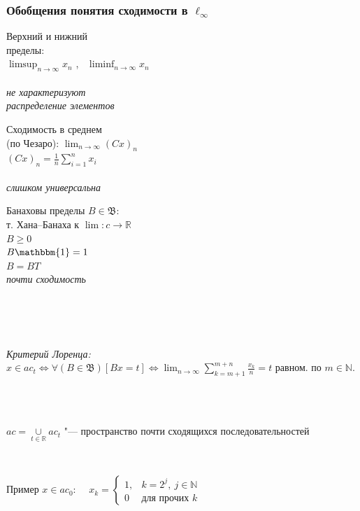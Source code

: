 \documentclass[10pt,pdf,hyperref={unicode},aspectratio=169]{beamer}
\theoremstyle{definition}
\begin{document}
\begin{frame}
	\frametitle{Обобщения понятия сходимости в $\ell_\infty$}
	\begin{varwidth}[t]{\linewidth}
		\centering
		Верхний и нижний
		\\
		пределы:
		\\
		$\displaystyle \limsup_{n\to\infty} x_n$
		,~
		$\displaystyle \liminf_{n\to\infty} x_n$
		\\~\\
		\emph{
			не характеризуют
			\\
			распределение элементов
		}
	\end{varwidth}
	\hfill
	\begin{varwidth}[t]{\linewidth}
		\centering
		Сходимость в среднем
		\\
		(по Чезаро):
		$\displaystyle \lim_{n\to\infty} (Cx)_n$
		\\
		$\displaystyle (Cx)_n = \frac1n\sum_{i=1}^n x_i$
		\\~\\
		\emph{слишком универсальна}
	\end{varwidth}
	\hfill
	\begin{varwidth}[t]{\linewidth}
		\centering
		Банаховы пределы $B\in \mathfrak{B}$:
		\\
		т. Хана--Банаха к $\lim: c\to\mathbb R$
		\\
			$B \geqslant 0$
		\\
			$B\mathbbm{1} = 1$
		\\
			$B=BT$
		\\
		\emph{почти сходимость}
	\end{varwidth}
	\\~\\~\\
	\begin{varwidth}[t]{\linewidth}
		\centering
		\emph{Критерий Лоренца:}
		$\displaystyle
			x\in ac_t
			\Leftrightarrow
			\forall(B\in\mathfrak{B})[Bx = t]
			\Leftrightarrow
			\lim_{n\to\infty}  \sum_{k=m+1}^{m+n} \frac{x_k}n = t
		$
		равном. по $m\in\mathbb{N}$.
	\end{varwidth}
	\\~\\
	\vspace{1em}
	\begin{varwidth}[t]{\linewidth}
		$\displaystyle ac = \mathop{\cup}\limits_{t\in\mathbb R} ac_t$ "--- пространство почти сходящихся последовательностей
	\end{varwidth}
	\\
	\vspace{1em}
	\begin{varwidth}[t]{\linewidth}
		Пример $x\in ac_0$:~~
		$\displaystyle
			x_k=\begin{cases}
				1, & k=2^j,~j\in\mathbb N
				\\
				0 & \mbox{для прочих~} k
			\end{cases}
		$
	\end{varwidth}
\end{frame}
\end{document}
